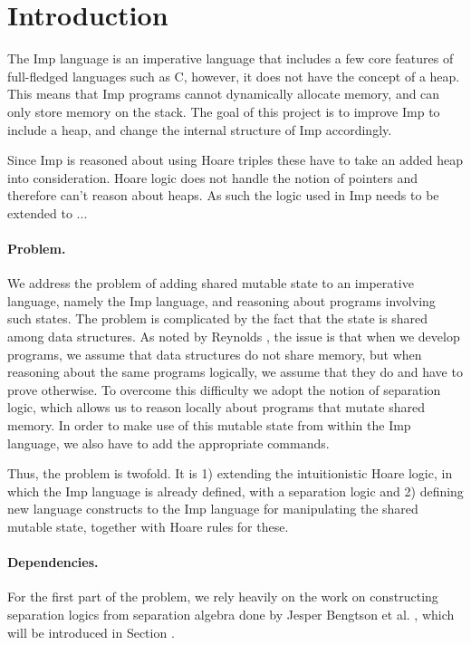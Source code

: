 \section{Introduction}
The Imp language is an imperative language that includes a few core features of full-fledged languages such as C, however, it does not have the concept of a heap. This means that Imp programs cannot dynamically allocate memory, and can only store memory on the stack. The goal of this project is to improve Imp to include a heap, and change the internal structure of Imp accordingly.

Since Imp is reasoned about using Hoare triples these have to take an added heap into consideration. Hoare logic does not handle the notion of pointers and therefore can't reason about heaps. As such the logic used in Imp needs to be extended to ...

\paragraph{Problem.}
We address the problem of adding shared mutable state to an imperative language, namely the Imp language, and reasoning about programs involving such states. The problem is complicated by the fact that the state is shared among data structures. As noted by Reynolds , the issue is that when we develop programs, we assume that data structures do not share memory, but when reasoning about the same programs logically, we assume that they do and have to prove otherwise. To overcome this difficulty we adopt the notion of separation logic, which allows us to reason locally about programs that mutate shared memory. In order to make use of this mutable state from within the Imp language, we also have to add the appropriate commands.

Thus, the problem is twofold. It is 1) extending the intuitionistic Hoare logic, in which the Imp language is already defined, with a separation logic and 2) defining new language constructs to the Imp language for manipulating the shared mutable state, together with Hoare rules for these.

\paragraph{Dependencies.}
For the first part of the problem, we rely heavily on the work on constructing separation logics from separation algebra done by Jesper Bengtson et al. , which will be introduced in Section .

